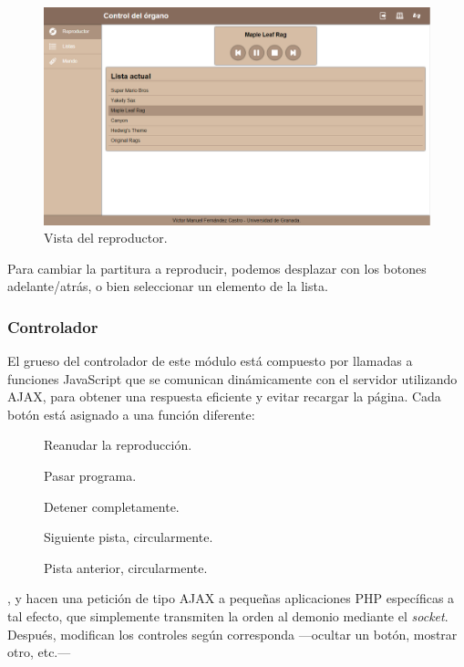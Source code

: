 \begin{figure}[H]
	\noindent \begin{centering}
		\includegraphics[width=\linewidth*3/4]{capitulo5/cap_reproductor}
		\par\end{centering}
	\smallskip
	\caption{\label{fig:cap_reproductor} Vista del reproductor.}
\end{figure} 

\smallskip

Para cambiar la partitura a reproducir, podemos desplazar con los botones adelante/atrás, o bien seleccionar un elemento de la lista.

\subsubsection{Controlador}

El grueso del controlador de este módulo está compuesto por llamadas a funciones JavaScript que se comunican dinámicamente con el servidor utilizando \acrshort{AJAX}, para obtener una respuesta eficiente y evitar recargar la página. Cada botón está asignado a una función diferente:

\begin{description}
	\item[] Reanudar la reproducción.
	\item[] Pasar programa.
	\item[] Detener completamente.
	\item[] Siguiente pista, circularmente.
	\item[] Pista anterior, circularmente.
\end{description}

,  y  hacen una petición de tipo \acrshort{AJAX} a pequeñas aplicaciones PHP específicas a tal efecto, que simplemente transmiten la orden al demonio mediante el \textit{socket}. Después, modifican los controles según corresponda ---ocultar un botón, mostrar otro, etc.---

